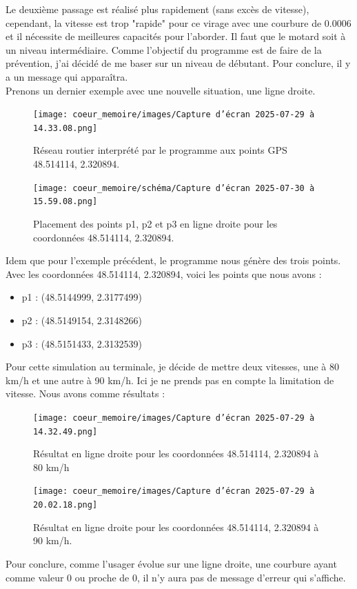 Le deuxième passage est réalisé plus rapidement (sans excès de vitesse), cependant, la vitesse est trop "rapide" pour ce virage avec une courbure de 0.0006 et il nécessite de meilleures capacités pour l'aborder. Il faut que le motard soit à un niveau intermédiaire. Comme l'objectif du programme est de faire de la prévention, j'ai décidé de me baser sur un niveau de débutant. Pour conclure, il y a un message qui apparaîtra.\\
Prenons un dernier exemple avec une nouvelle situation, une ligne droite.
\begin{figure}[H]
    \centering
    \texttt{[image: coeur\_memoire/images/Capture d’écran 2025-07-29 à 14.33.08.png]} 
    \caption{Réseau routier interprété par le programme aux points GPS 48.514114, 2.320894.}
\end{figure}
\begin{figure}[H]
    \centering
    \texttt{[image: coeur\_memoire/schéma/Capture d’écran 2025-07-30 à 15.59.08.png]} 
    \caption{Placement des points p1, p2 et p3 en ligne droite pour les coordonnées 48.514114, 2.320894.}
\end{figure}
Idem que pour l'exemple précédent, le programme nous génère des trois points. Avec les coordonnées 48.514114, 2.320894, voici les points que nous avons :
\begin{itemize}
    \item p1 : (48.5144999, 2.3177499)
    \item p2 : (48.5149154, 2.3148266)
    \item p3 : (48.5151433, 2.3132539)
\end{itemize}
\vspace{0.5cm}
Pour cette simulation au terminale, je décide de mettre deux vitesses, une à 80 km/h et une autre à 90 km/h. Ici je ne prends pas en compte la limitation de vitesse. Nous avons comme résultats :
\begin{figure}[H]
    \centering
    \texttt{[image: coeur\_memoire/images/Capture d’écran 2025-07-29 à 14.32.49.png]} 
    \caption{Résultat en ligne droite pour les coordonnées 48.514114, 2.320894 à 80 km/h}
\end{figure}
\begin{figure}[H]
    \centering
    \texttt{[image: coeur\_memoire/images/Capture d’écran 2025-07-29 à 20.02.18.png]} 
    \caption{Résultat en ligne droite pour les coordonnées 48.514114, 2.320894 à 90 km/h.}
\end{figure}
Pour conclure, comme l'usager évolue sur une ligne droite, une courbure ayant comme valeur 0 ou proche de 0, il n'y aura pas de message d'erreur qui s'affiche.

